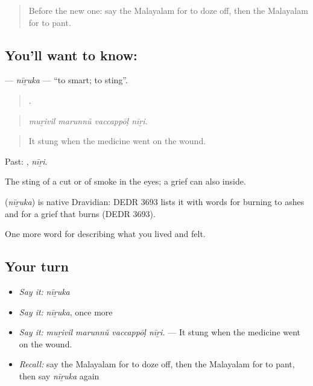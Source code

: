 \label{lesson:ML-C539-niruka}



\begin{quote}
Before the new one: say the Malayalam for to doze off, then the Malayalam for to pant.
\end{quote}

\subsection*{You'll want to know: }
\textbf{} — \emph{nīṟuka} — \textquotedblleft{}to smart; to sting\textquotedblright{}.

\begin{quote}
   .
\end{quote}

\begin{quote}
\emph{muṟivil marunnŭ vaccappōḷ nīṟi.}
\end{quote}

\begin{quote}
It stung when the medicine went on the wound.
\end{quote}

Past: , \emph{nīṟi}.

The sting of a cut or of smoke in the eyes; a grief can also  inside.

\begin{cousinweb}
\textbf{} (\emph{nīṟuka}) is native Dravidian: DEDR 3693 lists it with words for burning to ashes and for a grief that burns (DEDR 3693).
\end{cousinweb}

\begin{grammarlens}[title={What you've built}]
One more word for describing what you lived and felt.
\end{grammarlens}

\subsection*{Your turn}
\begin{itemize}
\raggedright
  \item \emph{Say it:} \emph{nīṟuka}
  \item \emph{Say it:} \emph{nīṟuka}, once more
  \item \emph{Say it:} \emph{muṟivil marunnŭ vaccappōḷ nīṟi.} — It stung when the medicine went on the wound.
  \item \emph{Recall:} say the Malayalam for to doze off, then the Malayalam for to pant, then say \emph{nīṟuka} again
\end{itemize}

